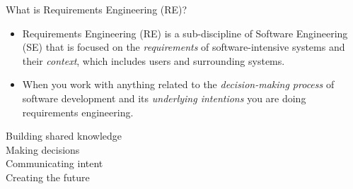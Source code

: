 \begin{Slide}{What is Requirements Engineering (RE)?}
\begin{itemize}
\item  Requirements Engineering (RE) is a sub-discipline of Software Engineering (SE) that is focused on the \textit{requirements} of software-intensive systems and their \textit{context}, which includes users and surrounding systems.
\item When you work with anything related to the \textit{decision-making process} of software development and its \emph{underlying intentions} you are doing requirements engineering.
\end{itemize}%
\hspace{2em}\begin{minipage}[t]{0.5\textwidth}
\vspace{1em} 
Building shared knowledge \\ Making decisions \\ Communicating intent \\ Creating the future
\end{minipage}%
\end{Slide}
